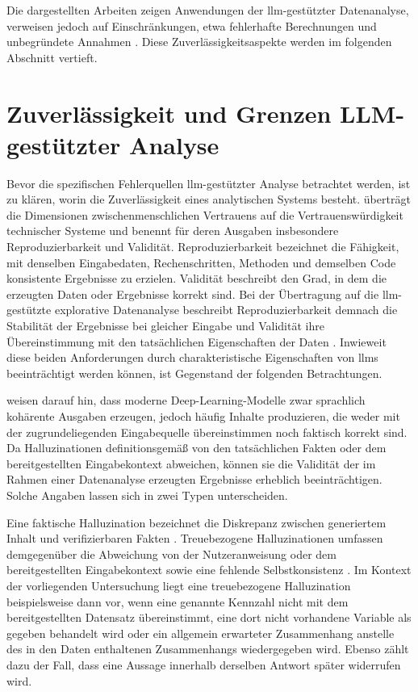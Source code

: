 Die dargestellten Arbeiten zeigen Anwendungen der \gls{llm}-gestützter Datenanalyse, verweisen jedoch auf Einschränkungen, etwa fehlerhafte Berechnungen \parencite{cheng_gpt_2023} und unbegründete Annahmen \parencite{li_tapilot-crossing_2024}. Diese Zuverlässigkeitsaspekte werden im folgenden Abschnitt vertieft.

\section{Zuverlässigkeit und Grenzen LLM-gestützter Analyse}
\label{sec:zuverlaessigkeit}

Bevor die spezifischen Fehlerquellen \gls{llm}-gestützter Analyse betrachtet werden, ist zu klären, worin die Zuverlässigkeit eines analytischen Systems besteht. \textcite{bornschlegl_towards_2024} überträgt die Dimensionen zwischenmenschlichen Vertrauens auf die Vertrauenswürdigkeit technischer Systeme und benennt für deren Ausgaben insbesondere Reproduzierbarkeit und Validität. Reproduzierbarkeit bezeichnet die Fähigkeit, mit denselben Eingabedaten, Rechenschritten, Methoden und demselben Code konsistente Ergebnisse zu erzielen. Validität beschreibt den Grad, in dem die erzeugten Daten oder Ergebnisse korrekt sind. Bei der Übertragung auf die \gls{llm}-gestützte explorative Datenanalyse beschreibt Reproduzierbarkeit demnach die Stabilität der Ergebnisse bei gleicher Eingabe und Validität ihre Übereinstimmung mit den tatsächlichen Eigenschaften der Daten \parencite{bornschlegl_towards_2024}. Inwieweit diese beiden Anforderungen durch charakteristische Eigenschaften von \glspl{llm} beeinträchtigt werden können, ist Gegenstand der folgenden Betrachtungen.

\textcite{ji_survey_2023} weisen darauf hin, dass moderne Deep-Learning-Modelle zwar sprachlich kohärente Ausgaben erzeugen, jedoch häufig Inhalte produzieren, die weder mit der zugrundeliegenden Eingabequelle übereinstimmen noch faktisch korrekt sind. Da Halluzinationen definitionsgemäß von den tatsächlichen Fakten oder dem bereitgestellten Eingabekontext abweichen, können sie die Validität der im Rahmen einer Datenanalyse erzeugten Ergebnisse erheblich beeinträchtigen. Solche Angaben lassen sich in zwei Typen unterscheiden. 

Eine faktische Halluzination bezeichnet die Diskrepanz zwischen generiertem Inhalt und verifizierbaren Fakten \parencite{bai_hallucination_2025}. Treuebezogene Halluzinationen umfassen demgegenüber die Abweichung von der Nutzeranweisung oder dem bereitgestellten Eingabekontext sowie eine fehlende Selbstkonsistenz \parencite{bai_hallucination_2025}. Im Kontext der vorliegenden Untersuchung liegt eine treuebezogene Halluzination beispielsweise dann vor, wenn eine genannte Kennzahl nicht mit dem bereitgestellten Datensatz übereinstimmt, eine dort nicht vorhandene Variable als gegeben behandelt wird oder ein allgemein erwarteter Zusammenhang anstelle des in den Daten enthaltenen Zusammenhangs wiedergegeben wird. Ebenso zählt dazu der Fall, dass eine Aussage innerhalb derselben Antwort später widerrufen wird.

